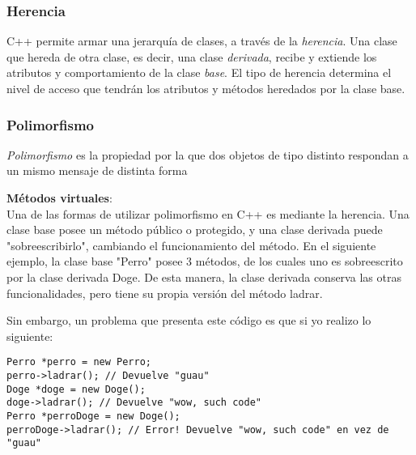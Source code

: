 \documentclass[a4paper, twoside]{article}
\newcommand{\codedir}{../resources/code} %
\begin{document}
\subsubsection{Herencia}
C++ permite armar una jerarquía de clases, a través de la \emph{herencia}. Una clase que hereda de otra clase, es decir, una clase \emph{derivada}, recibe y extiende los atributos y comportamiento de la clase \emph{base}.
El tipo de herencia determina el nivel de acceso que tendrán los atributos y métodos heredados por la clase base.


\subsubsection{Polimorfismo}
\emph{Polimorfismo} es la propiedad por la que dos objetos de tipo distinto respondan a un mismo mensaje de distinta forma

\textbf{Métodos virtuales}:\\
Una de las formas de utilizar polimorfismo en C++ es mediante la herencia. Una clase base posee un método público o protegido, y una clase derivada puede "sobreescribirlo", cambiando el funcionamiento del método.
En el siguiente ejemplo, la clase base "Perro" posee 3 métodos, de los cuales uno es sobreescrito por la clase derivada Doge. De esta manera, la clase derivada conserva las otras funcionalidades, pero tiene su propia versión del método ladrar.


Sin embargo, un problema que presenta este código es que si yo realizo lo siguiente:

\begin{lstlisting}
Perro *perro = new Perro;
perro->ladrar(); // Devuelve "guau"
Doge *doge = new Doge();
doge->ladrar(); // Devuelve "wow, such code"
Perro *perroDoge = new Doge();
perroDoge->ladrar(); // Error! Devuelve "wow, such code" en vez de "guau"
\end{lstlisting}
\end{document}
